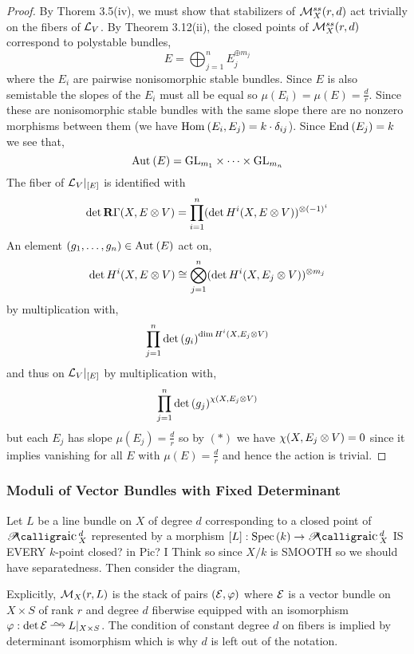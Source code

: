 \documentclass[12pt]{article}
\begin{document}
\begin{proof}
By Thorem 3.5(iv), we must show that stabilizers of $\mathcal{M}_X^{ss}(r,d)$ act trivially on the fibers of $\mathcal{L}_V$. By Theorem 3.12(ii), the closed points of $\mathcal{M}_X^{ss}(r,d)$ correspond to polystable bundles,
\[  E = \bigoplus_{j = 1}^n E_j^{\oplus m_j} \]
where the $E_i$ are pairwise nonisomorphic stable bundles. Since $E$ is also semistable the slopes of the $E_i$ must all be equal so $\mu(E_i) = \mu(E) = \frac{d}{r}$. Since these are nonisomorphic stable bundles with the same slope there are no nonzero morphisms between them (we have $\mathrm{Hom}_{} \left( E_i, E_j \right) = k \cdot \delta_{ij}$). Since $\mathrm{End}_{} \left( E_j \right) = k$ we see that,
\[ \mathrm{Aut}_{} \left( E \right) = \mathrm{GL}_{m_1} \times \cdots \times \mathrm{GL}_{m_n} \]
The fiber of $\mathcal{L}_V|_{[E]}$ is identified with
\[ \det{\mathbf{R}\Gamma(X, E \otimes V)} = \prod_{i = 1}^n (\det{H^i(X, E \otimes V)})^{\otimes (-1)^i} \]
An element $(g_1, \dots, g_n) \in \mathrm{Aut}_{} \left( E \right)$ act on,
\[ \det{H^i(X, E \otimes V)} \cong \bigotimes_{j = 1}^n (\det{H^i(X, E_j \otimes V)})^{\otimes m_j} \]
by multiplication with,
\[ \prod_{j = 1}^n \det{(g_i)}^{\dim{H^i(X, E_j \otimes V)}} \]
and thus on $\mathcal{L}_V|_{[E]}$ by multiplication with,
\[ \prod_{j = 1}^n \det{(g_j)}^{\chi(X, E_j \otimes V)} \]
but each $E_j$ has slope $\mu(E_j) = \frac{d}{r}$ so by $(\ast)$ we have $\chi(X, E_j \otimes V) = 0$ since it implies vanishing for all $E$ with $\mu(E) = \frac{d}{r}$ and hence the action is trivial.
\end{proof}

\subsubsection{Moduli of Vector Bundles with Fixed Determinant}

Let $L$ be a line bundle on $X$ of degree $d$ corresponding to a closed point of $\cPic^d_X$ represented by a morphism $[L] : \Spec{k} \to \cPic_X^d$ {\color{red} IS EVERY $k$-point closed? in Pic? I Think so since $X/k$ is SMOOTH so we should have separatedness}. Then consider the diagram,
\begin{center}
\end{center}

Explicitly, $\mathcal{M}_X(r,L)$ is the stack of pairs $(\mathcal{E}, \varphi)$ where $\mathcal{E}$ is a vector bundle on $X \times S$ of rank $r$ and degree $d$ fiberwise equipped with an isomorphism $\varphi : \det{\E} \iso L|_{X \times S}$. The condition of constant degree $d$ on fibers is implied by determinant isomorphism which is why $d$ is left out of the notation.
\end{document}
